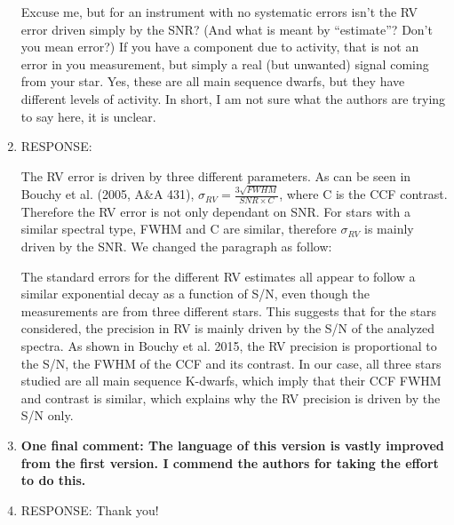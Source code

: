 \documentclass[11pt]{article}   	%
\begin{document}
\begin{enumerate}
{Excuse me, but for an instrument with no systematic errors isn't the RV error driven simply by the SNR? (And what is meant by ``estimate''? Don't you mean error?) If you have a component due to activity, that is not an error in you measurement, but simply a real (but unwanted) signal coming from your star. Yes, these are all main sequence dwarfs, but they have different levels of activity. In short, I am not sure what the authors are trying to say here, it is unclear.}
%
\item[]  RESPONSE:  {\color{blue} The RV error is driven by three different parameters. As can be seen in Bouchy et al. (2005, A\&A 431), $\sigma_{RV} = \frac{3\sqrt{FWHM}}{SNR\times C}$, where C is the CCF contrast. Therefore the RV error is not only dependant on SNR. For stars with a similar spectral type, FWHM and C are similar, therefore $\sigma_{RV}$ is mainly driven by the SNR.
We changed the paragraph as follow: 

The standard errors for the different RV estimates all appear to follow a similar exponential decay as a function of S/N, even though the measurements are from three different stars. This suggests that for the stars considered, the precision in RV is mainly driven by the S/N of the analyzed spectra. As shown in Bouchy et al. 2015, the RV precision is proportional to the S/N, the FWHM of the CCF and its contrast. In our case, all three stars studied are all main sequence K-dwarfs, which imply that their CCF FWHM and contrast is similar, which explains why the RV precision is driven by the S/N only.
}
\bigskip
%
%
\item {\bf One final comment: The language of this version is vastly improved from the first version. I commend the authors for taking the effort to do this.}
%
\item[]  RESPONSE:  Thank you!
\bigskip
%
%
\end{enumerate}
\end{document}
